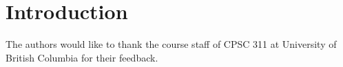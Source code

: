 \section{Introduction}


\appendix

\begin{acks}
    The authors would like to thank the course staff of CPSC 311 at University
    of British Columbia for their feedback.
\end{acks}
